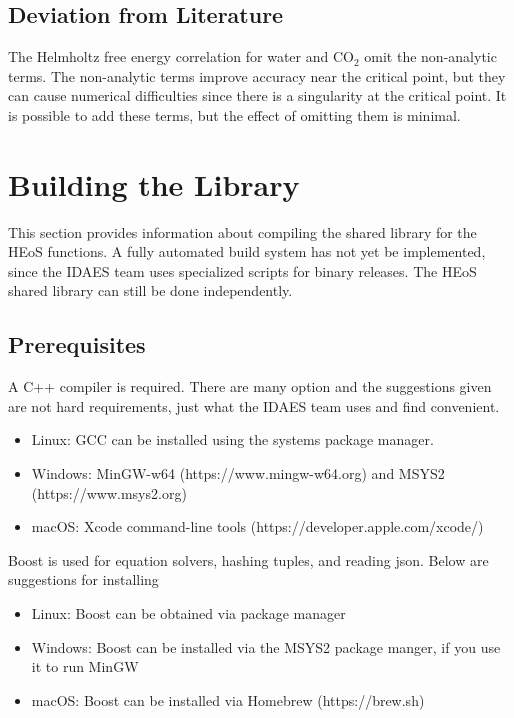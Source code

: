 \documentclass[oneside]{book}
\begin{document}
\section{Deviation from Literature}

The Helmholtz free energy correlation for water \cite{doi:10.1063/1.1461829} and CO$_2$ \cite{osti_402357} omit the non-analytic terms.  The non-analytic terms improve accuracy near the critical point, but they can cause numerical difficulties since there is a singularity at the critical point.  It is possible to add these terms, but the effect of omitting them is minimal.

\chapter{Building the Library}

This section provides information about compiling the shared library for the HEoS functions. A fully automated build system has not yet be implemented, since the IDAES team uses specialized scripts for binary releases.  The HEoS shared library can still be done independently.

\section{Prerequisites}

A C++ compiler is required. There are many option and the suggestions given are not hard requirements, just what the IDAES team uses and find convenient. 
\begin{itemize}
\item Linux: GCC can be installed using the systems package manager.
\item Windows: MinGW-w64 (https://www.mingw-w64.org) and MSYS2 (https://www.msys2.org)
\item macOS: Xcode command-line tools (https://developer.apple.com/xcode/)
\end{itemize}

Boost is used for equation solvers, hashing tuples, and reading json.  Below are suggestions for installing 
\begin{itemize}
\item Linux: Boost can be obtained via package manager
\item Windows: Boost can be installed via the MSYS2 package manger, if you use it to run MinGW
\item macOS: Boost can be installed via Homebrew (https://brew.sh)
\end{itemize}
\end{document}
